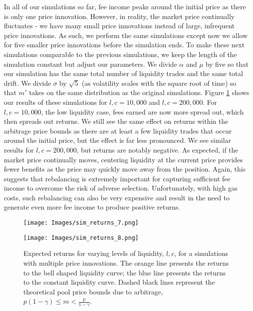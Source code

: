 \documentclass[11pt]{article}
\begin{document}
In all of our simulations so far, fee income peaks around the initial price as there is only one price innovation. However, in reality, the market price continually fluctuates - we have many small price innovations instead of large, infrequent price innovations. As such, we perform the same simulations except now we allow for five smaller price innovations before the simulation ends. To make these next simulations comparable to the previous simulations, we keep the length of the simulation constant but adjust our parameters. We divide $\alpha$ and $\mu$ by five so that our simulation has the same total number of liquidity trades and the same total drift. We divide $\sigma$ by $\sqrt{5}$ (as volatility scales with the square root of time) so that $m'$ takes on the same distribution as the original simulations. Figure \ref{fig:sim_returns_7-8} shows our results of these simulations for $l, c = 10,000$ and $l, c = 200,000$. For $l, c = 10,000$, the low liquidity case, fees earned are now more spread out, which then spreads out returns. We still see the same effect on returns within the arbitrage price bounds as there are at least a few liquidity trades that occur around the initial price, but the effect is far less pronounced. We see similar results for $l, c = 200,000$, but returns are notably negative. As expected, if the market price continually moves, centering liquidity at the current price provides fewer benefits as the price may quickly move away from the position. Again, this suggests that rebalancing is extremely important for capturing sufficient fee income to overcome the risk of adverse selection. Unfortunately, with high gas costs, such rebalancing can also be very expensive and result in the need to generate even more fee income to produce positive returns.

\begin{figure}[H]
    \centering
    \begin{minipage}[b]{\textwidth}
        \texttt{[image: Images/sim\_returns\_7.png]}
    \end{minipage}
    \begin{minipage}[b]{\textwidth}
        \texttt{[image: Images/sim\_returns\_8.png]}
    \end{minipage}
    \caption{Expected returns for varying levels of liquidity, $l, c$, for a simulations with multiple price innovations. The orange line presents the returns to the bell shaped liquidity curve; the blue line presents the returns to the constant liquidity curve. Dashed black lines represent the theoretical pool price bounds due to arbitrage, $p (1 - \gamma) \le m < \frac{p}{1 - \gamma}$.}
    \label{fig:sim_returns_7-8}
\end{figure}
\end{document}
